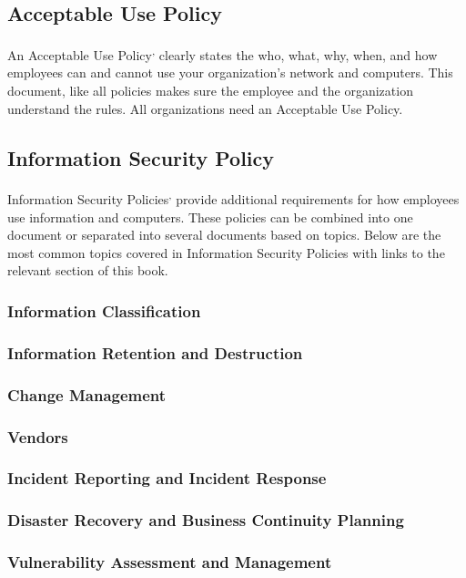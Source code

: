 \subsection{Acceptable Use Policy}
An Acceptable Use Policy\textsuperscript{,} clearly states the who, what, why, when, and how employees can and cannot use your organization's network and computers. This document, like all policies makes sure the employee and the organization understand the rules. All organizations need an Acceptable Use Policy.
\subsection{Information Security Policy}
Information Security Policies\textsuperscript{,} provide additional requirements for how employees use information and computers. These policies can be combined into one document or separated into several documents based on topics. Below are the most common topics covered in Information Security Policies with links to the relevant section of this book.
\subsubsection{Information Classification}
\subsubsection{Information Retention and Destruction}
\subsubsection{Change Management}
\subsubsection{Vendors}
\subsubsection{Incident Reporting and Incident Response}
\subsubsection{Disaster Recovery and Business Continuity Planning}
\subsubsection{Vulnerability Assessment and Management}

